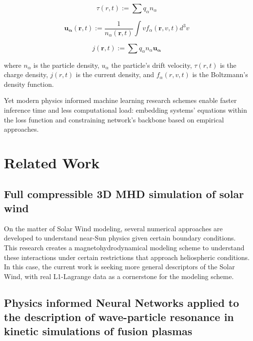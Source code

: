 \documentclass[12pt]{article}
\begin{document}
\begin{equation}
    \tau(r, t) := \sum q_{\alpha} n_{\alpha}
\end{equation}

\begin{equation}
    \mathbf{u_{\alpha}} (\mathbf{r}, t) := \frac{1}{n_{\alpha}(\mathbf{r}, t)} \int v f_{\alpha}(\mathbf{r}, v, t) d^3v
\end{equation}

\begin{equation}
    j(\mathbf{r}, t) := \sum q_{\alpha} n_{\alpha} \mathbf{u_{\alpha}}
\end{equation}

where $n_{\alpha}$ is the particle density, $u_{\alpha}$ the particle's drift velocity, $\tau(r, t)$ is the charge density, $j(r, t)$ is the current density, and $f_{\alpha}(r, v, t)$ is the Boltzmann's density function.

Yet modern physics informed machine learning research schemes enable faster inference time and less computational load: embedding systems' equations within the loss function and constraining network's backbone based on empirical approaches.

\section{Related Work}

\subsection{Full compressible 3D MHD simulation of solar wind}
On the matter of Solar Wind modeling, several numerical approaches are developed to understand near-Sun physics given certain boundary conditions. This research \cite{windmodelling1} creates a magnetohydrodynamical modeling scheme to understand these interactions under certain restrictions that approach heliospheric conditions. In this case, the current work is seeking more general descriptors of the Solar Wind, with real L1-Lagrange data as a cornerstone for the modeling scheme.

\subsection{Physics informed Neural Networks applied to the description of wave-particle resonance in kinetic simulations of fusion plasmas}

\cite{kumar2023physicsinformedneuralnetworks}
\end{document}
